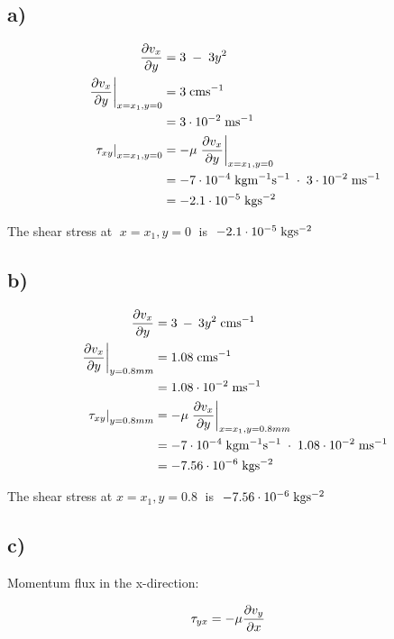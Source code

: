 \documentclass[11pt]{article}
\begin{document}
    \subsection{a)}\label{a}

    \begin{align}
\frac{\partial v_x}{\partial y} &= 3 \; - \; 3y^2  \\
\left.\frac{\partial v_x}{\partial y}\right|_{x = x_{1} , y = 0}  &= 3 \; \mathrm{cm s^{-1}} \nonumber \\
&= 3 \cdot 10^{-2} \; \mathrm{ms^{-1}} \nonumber \\
\left.\tau_{xy}\right|_{x = x_{1} , y = 0} &= - \mu \left.\frac{\partial v_x}{\partial y}\right|_{x = x_{1} , y = 0} \nonumber \\
&= -7 \cdot 10^{-4} \; \mathrm{kg m^{-1} s^{-1}}  \; \cdot \; 3 \cdot 10^{-2} \; \mathrm{ms^{-1}} \nonumber \\
&= -2.1 \cdot 10^{-5} \; \mathrm{kgs^{-2}} \nonumber
\end{align}

The shear stress at \(\; x=x_1 , y=0 \;\) is
\(\; -2.1 \cdot 10^{-5} \; \mathrm{kgs^{-2}}\)

    \subsection{b)}\label{b}

    \begin{align}
\frac{\partial v_x}{\partial y} &= 3 \: - \: 3y^2 \; \mathrm{cm s^{-1}} \nonumber \\
\left.\frac{\partial v_x}{\partial y}\right|_{y=0.8 mm} &= 1.08 \; \mathrm{cm s^{-1}} \nonumber \\
&= 1.08 \cdot 10^{-2} \; \mathrm{ms^{-1}} \nonumber \\
\left.\tau_{xy}\right|_{y=0.8mm} &= - \mu \left.\frac{\partial v_x}{\partial y}\right|_{x = x_{1} , y = 0.8mm} \nonumber \\
&= -7 \cdot 10^{-4} \; \mathrm{kgm^{-1}s^{-1}}  \; \cdot \;  1.08 \cdot 10^{-2} \; \mathrm{ms^{-1}} \nonumber \\
&= - 7.56 \cdot 10^{-6} \; \mathrm{kgs^{-2}} \nonumber
\end{align}

The shear stress at \(x=x_1 , y=0.8 \;\) is
\(\; -7.56 \cdot 10^{-6} \; \mathrm{kgs^{-2}}\)

    \subsection{c)}\label{c}

    Momentum flux in the x-direction:

\begin{align}
\tau_{yx} &= - \mu \frac{\partial v_y}{\partial x} 
\end{align}
\end{document}
